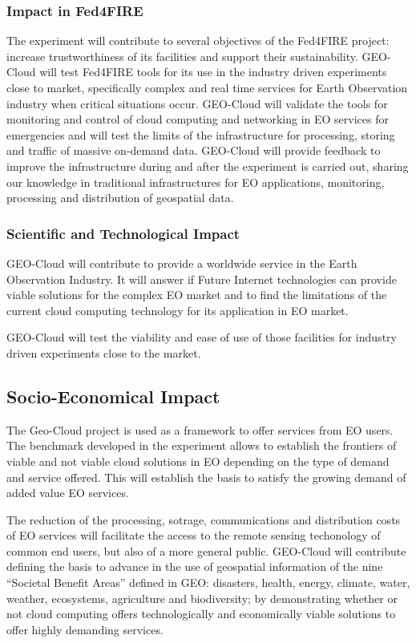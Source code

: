 \subsubsection{Impact in Fed4FIRE}
The experiment will contribute to several objectives of the Fed4FIRE project:
increase trustworthiness of its facilities and support their
sustainability. GEO-Cloud will test Fed4FIRE tools for its use in the industry
driven experiments close to market, specifically complex and real time services
for Earth Observation industry when critical situations occur. 
GEO-Cloud will validate the tools for monitoring and control of cloud computing
and networking in EO services for emergencies and will test the limits of the
infrastructure for processing, storing and traffic of massive on-demand
data. GEO-Cloud will provide feedback to improve the infrastructure during and
after the experiment is carried out, sharing our knowledge in traditional
infrastructures for \acs{EO} applications, monitoring, processing and
distribution of geospatial data.

\subsubsection{Scientific and Technological Impact}

GEO-Cloud will contribute to provide a worldwide service in the Earth
Observation Industry. It will answer if Future Internet technologies can provide
viable solutions for the complex \acs{EO} market and to find the limitations of
the current cloud computing technology for its application in \acs{EO} market.
 
GEO-Cloud will test the viability and ease of use of those facilities for
industry driven experiments close to the market.

\subsection{Socio-Economical Impact}

The Geo-Cloud project is used as a framework to offer services from \acs{EO}
users. The benchmark developed in the experiment allows to establish the
frontiers of viable and not viable cloud solutions in \acs{EO} depending on the
type of demand and service offered. This will establish the basis to satisfy the
growing demand of added value \acs{EO} services.

The reduction of the processing, sotrage, communications and distribution costs
of {EO} services will facilitate the access to the remote sensing techonology of
common end users, but also of a more general public. GEO-Cloud will contribute
defining the basis to advance in the use of geospatial information of the nine
``Societal Benefit Areas'' defined in GEO: disasters, health, energy, climate,
water, weather, ecosystems, agriculture and biodiversity; by demonstrating
whether or not cloud computing offers technologically and economically viable
solutions to offer highly demanding services.

